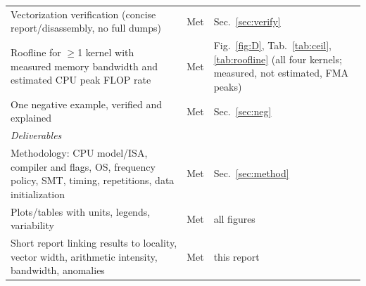 \documentclass{article}
\begin{document}
\begin{center}
\begin{longtable}{p{6.3cm}p{1.5cm}p{7.7cm}}
Vectorization verification (concise report/disassembly, no full dumps) & Met & Sec.~\ref{sec:verify} \\
Roofline for $\ge$1 kernel with measured memory bandwidth and estimated CPU peak FLOP rate & Met & Fig.~\ref{fig:D}, Tab.~\ref{tab:ceil}, \ref{tab:roofline} (all four kernels; measured, not estimated, FMA peaks) \\
One negative example, verified and explained & Met & Sec.~\ref{sec:neg} \\
\midrule
\multicolumn{3}{l}{\textit{Deliverables}} \\
Methodology: CPU model/ISA, compiler and flags, OS, frequency policy, SMT, timing, repetitions, data initialization & Met & Sec.~\ref{sec:method} \\
Plots/tables with units, legends, variability & Met & all figures \\
Short report linking results to locality, vector width, arithmetic intensity, bandwidth, anomalies & Met & this report \\
\bottomrule
\end{longtable}
\end{center}
\end{document}
